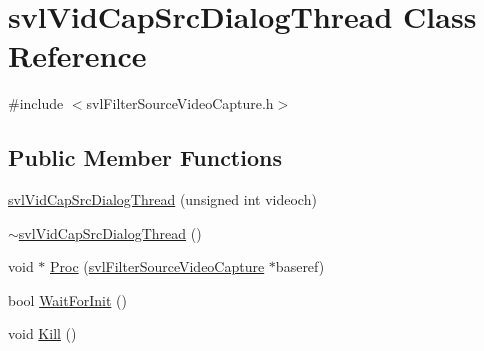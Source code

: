 \hypertarget{classsvl_vid_cap_src_dialog_thread}{\section{svl\-Vid\-Cap\-Src\-Dialog\-Thread Class Reference}
\label{classsvl_vid_cap_src_dialog_thread}
}


{\ttfamily \#include $<$svl\-Filter\-Source\-Video\-Capture.\-h$>$}

\subsection*{Public Member Functions}
\begin{DoxyCompactItemize}
\item 
\hyperlink{classsvl_vid_cap_src_dialog_thread_a2940a06273a910dd94dd641cc50d3faa}{svl\-Vid\-Cap\-Src\-Dialog\-Thread} (unsigned int videoch)
\item 
\hyperlink{classsvl_vid_cap_src_dialog_thread_adeafa27987555118632063e55346bf56}{$\sim$svl\-Vid\-Cap\-Src\-Dialog\-Thread} ()
\item 
void $\ast$ \hyperlink{classsvl_vid_cap_src_dialog_thread_a0f74a0e0d1d8bcd7aa6ce4823318236a}{Proc} (\hyperlink{classsvl_filter_source_video_capture}{svl\-Filter\-Source\-Video\-Capture} $\ast$baseref)
\item 
bool \hyperlink{classsvl_vid_cap_src_dialog_thread_a578e3c36e7caf08956688408bb1e65f9}{Wait\-For\-Init} ()
\item 
void \hyperlink{classsvl_vid_cap_src_dialog_thread_adf803dd185f9e23661986bceedb1aac9}{Kill} ()
\end{DoxyCompactItemize}


